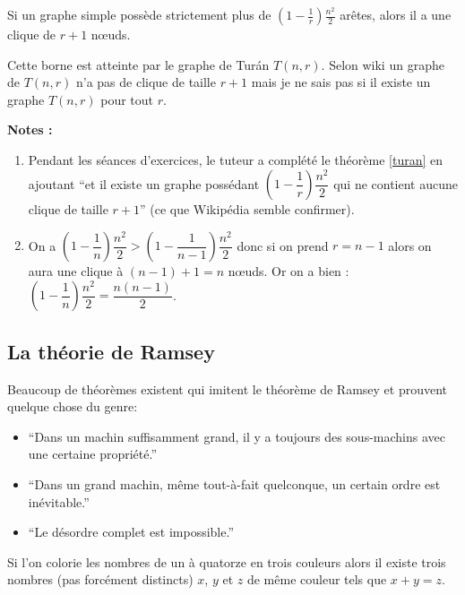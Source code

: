 \begin{mytheo}
 \label{turan}
Si un graphe simple possède strictement plus de $(1-\frac{1}{r})\frac{n^2}{2}$ arêtes, alors il a une clique de $r+1$ nœuds.
\end{mytheo}

Cette borne est atteinte par le graphe de Turán $T(n,r)$.  Selon wiki un graphe de $T(n,r)$ n'a pas de clique de taille $ r+1$ mais je ne sais pas si il existe un graphe $T(n,r)$ pour tout $r$.


\textbf{Notes :}
\begin{enumerate}
\item
Pendant les séances d'exercices, le tuteur a complété le théorème \ref{turan} en ajoutant ``et il existe un graphe possédant $\left( 1-\dfrac{1}{r} \right) \dfrac{n^2}{2}$ qui ne contient aucune clique de taille $r+1$'' (ce que Wikipédia semble confirmer).
\item
On a  $\left( 1-\dfrac{1}{n} \right) \dfrac{n^2}{2} > \left( 1-\dfrac{1}{n-1} \right) \dfrac{n^2}{2}$ donc si on prend $r=n-1$ alors on aura une clique à $(n-1)+1=n$ nœuds. Or on a bien : $\left( 1-\dfrac{1}{n} \right) \dfrac{n^2}{2} = \dfrac{n(n-1)}{2}$.
\end{enumerate}


\subsection{La théorie de Ramsey}
Beaucoup de théorèmes existent qui imitent le théorème de Ramsey et prouvent quelque chose du genre:
\begin{itemize}
\item
``Dans un machin suffisamment grand, il y a toujours des sous-machins avec une certaine propriété.''
\item
``Dans un grand machin, m\^eme tout-à-fait quelconque, un certain ordre est inévitable.''
\item
``Le désordre complet est impossible.''
\end{itemize}



\begin{mytheo} 
    Si l'on colorie les nombres de un à quatorze en trois couleurs alors il existe trois nombres (pas forcément distincts) $x$, $y$ et $z$ de m\^eme couleur tels que $x+y=z$.
\end{mytheo}

